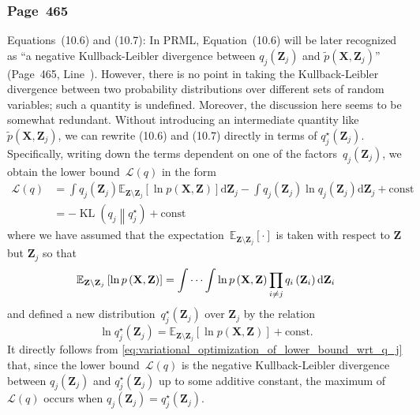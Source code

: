 \documentclass[12pt,a4paper]{article}
\newcommand{\erratum}[1]{\subsubsection*{#1}}
\begin{document}
\erratum{Page~465}
Equations~(10.6) and (10.7):
In PRML, Equation~(10.6) will be later recognized as ``a negative Kullback-Leibler divergence
between $q_j(\mathbf{Z}_j)$ and $\widetilde{p}(\mathbf{X}, \mathbf{Z}_j)$''
(Page~465, Line~).
However, there is no point in taking the Kullback-Leibler divergence between two probability
distributions over different sets of random variables; such a quantity is undefined.
Moreover, the discussion here seems to be somewhat redundant.
Without introducing an intermediate quantity like $\widetilde{p}(\mathbf{X}, \mathbf{Z}_j)$,
we can rewrite (10.6) and (10.7) directly in terms of $q_j^{\star}(\mathbf{Z}_j)$.
Specifically,
writing down the terms dependent on one of the factors~$q_j\left(\mathbf{Z}_j\right)$,
we obtain the lower bound~$\mathcal{L}(q)$ in the form
\begin{align}
\mathcal{L}(q)
&= \int q_j\left(\mathbf{Z}_j\right)
\mathbb{E}_{\mathbf{Z}\setminus\mathbf{Z}_j}
\left[ \ln p\left(\mathbf{X}, \mathbf{Z}\right) \right]
\mathrm{d}\mathbf{Z}_j
- \int q_j\left(\mathbf{Z}_j\right) \ln q_j\left(\mathbf{Z}_j\right) \mathrm{d}\mathbf{Z}_j
 + \text{const} \\
&= - \operatorname{KL}\left( q_j \middle\| q_j^{\star} \right) + \text{const}
\label{eq:variational_optimization_of_lower_bound_wrt_q_j}
\end{align}
where we have assumed that the expectation~$\mathbb{E}_{\mathbf{Z}\setminus\mathbf{Z}_j}[\cdot]$
is taken with respect to $\mathbf{Z}$ but $\mathbf{Z}_j$ so that
\begin{equation}
\mathbb{E}_{\mathbf{Z}\setminus\mathbf{Z}_j}
\left[ \ln p\left(\mathbf{X}, \mathbf{Z}\right) \right] =
\idotsint \ln p\left(\mathbf{X}, \mathbf{Z}\right)
\prod_{i \neq j} q_i\left(\mathbf{Z}_i\right) \mathrm{d}\mathbf{Z}_i
\end{equation}
and defined a new distribution~$q_j^{\star}\left(\mathbf{Z}_j\right)$ over
$\mathbf{Z}_j$ by the relation
\begin{equation}
\ln q_j^{\star}\left(\mathbf{Z}_j\right) =
\mathbb{E}_{\mathbf{Z}\setminus\mathbf{Z}_j}
\left[ \ln p\left(\mathbf{X}, \mathbf{Z}\right) \right] + \text{const}.
\label{eq:optimal_solution_for_variational_bayes}
\end{equation}
It directly follows from \eqref{eq:variational_optimization_of_lower_bound_wrt_q_j} that,
since the lower bound~$\mathcal{L}(q)$ is the negative Kullback-Leibler divergence between
$q_j(\mathbf{Z}_j)$ and $q_j^{\star}(\mathbf{Z}_j)$ up to some additive constant,
the maximum of $\mathcal{L}(q)$ occurs when $q_j(\mathbf{Z}_j) = q_j^{\star}(\mathbf{Z}_j)$.
\end{document}
